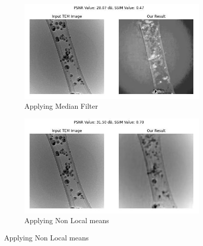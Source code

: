 \begin{figure}[H]
    \vspace{15pt} %
    
    \begin{subfigure}{.47\textwidth} %
        \includegraphics[width=\textwidth]{img/Results/Dataset_4/Dataset_4_median_filter.jpg}
        \caption{Applying Median Filter}
        \label{fig:Image3}
    \end{subfigure}
    \hfill
    \begin{subfigure}{.47\textwidth} %
        \includegraphics[width=\textwidth]{img/Results/Dataset_4/Dataset_4_non_local_means.jpg}
        \caption{Applying Non Local means}
        \label{fig:Image4}
    \end{subfigure}
    
    \vspace{15pt} %
    

\end{figure}
